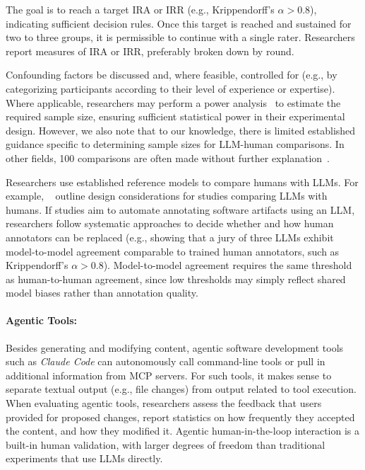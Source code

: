 The goal is to reach a target IRA or IRR (e.g., Krippendorff's $\alpha>0.8$), indicating sufficient decision rules. Once this target is reached and sustained for two to three groups, it is permissible to continue with a single rater.
Researchers \should report measures of IRA or IRR, preferably broken down by round.

Confounding factors \should be discussed and, where feasible, controlled for (e.g., by categorizing participants according to their level of experience or expertise).
Where applicable, researchers may perform a power analysis~\cite{Cohen1992,DBLP:journals/infsof/DybaKS06} to estimate the required sample size, ensuring sufficient statistical power in their experimental design.
However, we also note that to our knowledge, there is limited established guidance specific to determining sample sizes for LLM-human comparisons. In other fields, 100 comparisons are often made without further explanation~\cite{tam2024framework}.

Researchers \should use established reference models to compare humans with LLMs.
For example, \citeauthor{Schneider2025ReferenceModel}~\cite{Schneider2025ReferenceModel} outline design considerations for studies comparing LLMs with humans.
If studies aim to automate annotating software artifacts using an LLM, researchers \should follow systematic approaches to decide whether and how human annotators can be replaced (e.g., showing that a jury of three LLMs exhibit model-to-model agreement comparable to trained human annotators, such as Krippendorff's $\alpha>0.8$). Model-to-model agreement requires the same threshold as human-to-human agreement, since low thresholds may simply reflect shared model biases rather than annotation quality.

\paragraph{Agentic Tools:}
Besides generating and modifying content, agentic software development tools such as \emph{Claude Code} can autonomously call command-line tools or pull in additional information from MCP servers.
For such tools, it makes sense to separate textual output (e.g., file changes) from output related to tool execution.
When evaluating agentic tools, researchers \should assess the feedback that users provided for proposed changes, report statistics on how frequently they accepted the content, and how they modified it.
Agentic human-in-the-loop interaction is a built-in human validation, with larger degrees of freedom than traditional experiments that use LLMs directly.

